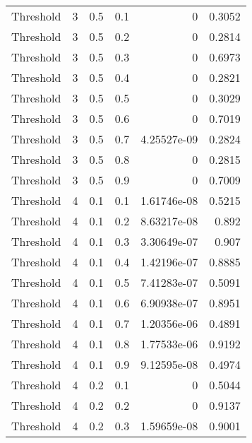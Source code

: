 \documentclass{article}
\begin{document}
\begin{longtable}[H]{lrrrrr}
 Threshold      &       3 &   0.5 &            0.1 &   0           &          0.3052 \\
 Threshold      &       3 &   0.5 &            0.2 &   0           &          0.2814 \\
 Threshold      &       3 &   0.5 &            0.3 &   0           &          0.6973 \\
 Threshold      &       3 &   0.5 &            0.4 &   0           &          0.2821 \\
 Threshold      &       3 &   0.5 &            0.5 &   0           &          0.3029 \\
 Threshold      &       3 &   0.5 &            0.6 &   0           &          0.7019 \\
 Threshold      &       3 &   0.5 &            0.7 &   4.25527e-09 &          0.2824 \\
 Threshold      &       3 &   0.5 &            0.8 &   0           &          0.2815 \\
 Threshold      &       3 &   0.5 &            0.9 &   0           &          0.7009 \\
 Threshold      &       4 &   0.1 &            0.1 &   1.61746e-08 &          0.5215 \\
 Threshold      &       4 &   0.1 &            0.2 &   8.63217e-08 &          0.892  \\
 Threshold      &       4 &   0.1 &            0.3 &   3.30649e-07 &          0.907  \\
 Threshold      &       4 &   0.1 &            0.4 &   1.42196e-07 &          0.8885 \\
 Threshold      &       4 &   0.1 &            0.5 &   7.41283e-07 &          0.5091 \\
 Threshold      &       4 &   0.1 &            0.6 &   6.90938e-07 &          0.8951 \\
 Threshold      &       4 &   0.1 &            0.7 &   1.20356e-06 &          0.4891 \\
 Threshold      &       4 &   0.1 &            0.8 &   1.77533e-06 &          0.9192 \\
 Threshold      &       4 &   0.1 &            0.9 &   9.12595e-08 &          0.4974 \\
 Threshold      &       4 &   0.2 &            0.1 &   0           &          0.5044 \\
 Threshold      &       4 &   0.2 &            0.2 &   0           &          0.9137 \\
 Threshold      &       4 &   0.2 &            0.3 &   1.59659e-08 &          0.9001 \\

\end{longtable}
\end{document}
